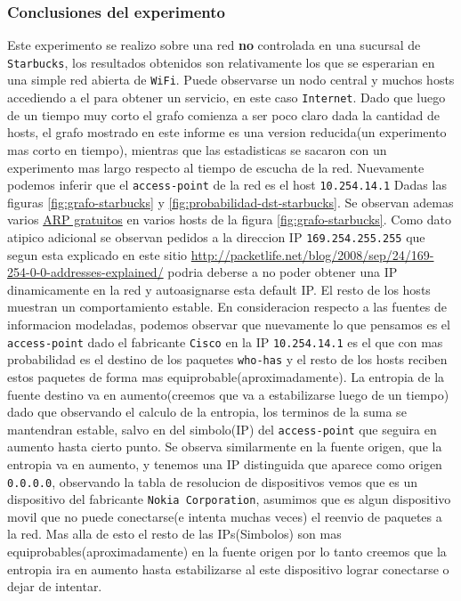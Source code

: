 \subsubsection{Conclusiones del experimento}
Este experimento se realizo sobre una red \textbf{no} controlada en una sucursal de \texttt{Starbucks}, los resultados obtenidos son relativamente los que se esperarian en una simple red abierta de \texttt{WiFi}. Puede observarse un nodo central y muchos hosts accediendo a el para obtener un servicio, en este caso \texttt{Internet}. Dado que luego de un tiempo muy corto el grafo comienza a ser poco claro dada la cantidad de hosts, el grafo mostrado en este informe es una version reducida(un experimento mas corto en tiempo), mientras que las estadisticas se sacaron con un experimento mas largo respecto al tiempo de escucha de la red. Nuevamente podemos inferir que el \texttt{access-point} de la red es el host \texttt{10.254.14.1} Dadas las figuras \ref{fig:grafo-starbucks} y \ref{fig:probabilidad-dst-starbucks}. Se observan ademas varios \href{http://wiki.wireshark.org/Gratuitous_ARP}{ARP gratuitos} en varios hosts de la figura \ref{fig:grafo-starbucks}. Como dato atipico adicional se observan pedidos a la direccion IP \texttt{169.254.255.255} que segun esta explicado en este sitio \url{http://packetlife.net/blog/2008/sep/24/169-254-0-0-addresses-explained/} podria deberse a no poder obtener una IP dinamicamente en la red y autoasignarse esta default IP. El resto de los hosts muestran un comportamiento estable. En consideracion respecto a las fuentes de informacion modeladas, podemos observar que nuevamente lo que pensamos es el \texttt{access-point} dado el fabricante \texttt{Cisco} en la IP \texttt{10.254.14.1} es el que con mas probabilidad es el destino de los paquetes \texttt{who-has} y el resto de los hosts reciben estos paquetes de forma mas equiprobable(aproximadamente). La entropia de la fuente destino va en aumento(creemos que va a estabilizarse luego de un tiempo) dado que observando el calculo de la entropia, los terminos de la suma se mantendran estable, salvo en del simbolo(IP) del \texttt{access-point} que seguira en aumento hasta cierto punto. Se observa similarmente en la fuente origen, que la entropia va en aumento, y tenemos una IP distinguida que aparece como origen \texttt{0.0.0.0}, observando la tabla de resolucion de dispositivos vemos que es un dispositivo del fabricante \texttt{Nokia Corporation}, asumimos que es algun dispositivo movil que no puede conectarse(e intenta muchas veces) el reenvio de paquetes a la red. Mas alla de esto el resto de las IPs(Simbolos) son mas equiprobables(aproximadamente) en la fuente origen por lo tanto creemos que la entropia ira en aumento hasta estabilizarse al este dispositivo lograr conectarse o dejar de intentar.